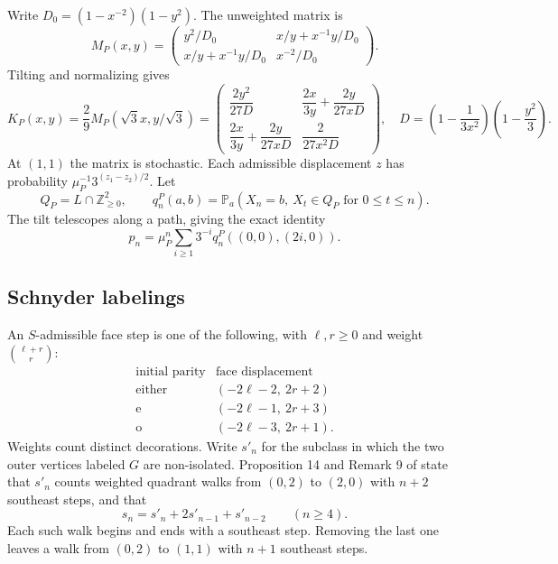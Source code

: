 \documentclass[11pt,letterpaper]{article}
\numberwithin{equation}{section}
\theoremstyle{remark}\newtheorem{remark}[theorem]{Remark}
\newcommand{\PP}{\mathbb P}
\newcommand{\ZZ}{\mathbb Z}
\newcommand{\e}{\mathrm e}
\newcommand{\oState}{\mathrm o}
\begin{document}
Write $D_0=(1-x^{-2})(1-y^2)$. The unweighted matrix is
\begin{equation}
 M_P(x,y)=\begin{pmatrix}
 y^2/D_0&x/y+x^{-1}y/D_0\\
 x/y+x^{-1}y/D_0&x^{-2}/D_0
 \end{pmatrix}.
\end{equation}
Tilting and normalizing gives
\begin{equation}\label{cps:eq:PK}
 K_P(x,y)=\frac2{9}M_P(\sqrt3x,y/\sqrt3)
 =\begin{pmatrix}
 \dfrac{2y^2}{27D}&\dfrac{2x}{3y}+\dfrac{2y}{27xD}\\[5pt]
 \dfrac{2x}{3y}+\dfrac{2y}{27xD}&\dfrac{2}{27x^2D}
 \end{pmatrix},\quad
 D=\left(1-\frac1{3x^2}\right)\left(1-\frac{y^2}3\right).
\end{equation}
At $(1,1)$ the matrix is stochastic. Each admissible displacement $z$ has probability $\mu_P^{-1}3^{(z_1-z_2)/2}$. Let
\begin{equation}
 Q_P=L\cap\ZZ_{\ge0}^2,\qquad
 q_n^P(a,b)=\PP_a(X_n=b,\ X_t\in Q_P\text{ for }0\le t\le n).
\end{equation}
The tilt telescopes along a path, giving the exact identity
\begin{equation}\label{cps:eq:Pcount}
 p_n=\mu_P^n\sum_{i\ge1}3^{-i}q_n^P((0,0),(2i,0)).
\end{equation}

\subsection{Schnyder labelings}
An $S$-admissible face step is one of the following, with $\ell,r\ge0$ and weight $\binom{\ell+r}{r}$:
\begin{equation}\label{cps:eq:Ssteps}
 \begin{array}{c|c}
 \text{initial parity}&\text{face displacement}\\ \hline
 \text{either}&(-2\ell-2,\ 2r+2)\\
 \e&(-2\ell-1,\ 2r+3)\\
 \oState&(-2\ell-3,\ 2r+1).
 \end{array}
\end{equation}
Weights count distinct decorations. Write $s'_n$ for the subclass in which the two outer vertices labeled $G$ are non-isolated. Proposition 14 and Remark 9 of \cite{FNS} state that $s'_n$ counts weighted quadrant walks from $(0,2)$ to $(2,0)$ with $n+2$ southeast steps, and that
\begin{equation}\label{cps:eq:Sconversion}
 s_n=s'_n+2s'_{n-1}+s'_{n-2}\qquad(n\ge4).
\end{equation}
Each such walk begins and ends with a southeast step. Removing the last one leaves a walk from $(0,2)$ to $(1,1)$ with $n+1$ southeast steps.
\end{document}
